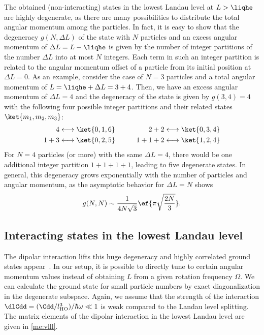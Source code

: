 The obtained (non-interacting) states in the lowest Landau level at $L>\liqhe$ are highly degenerate, as there are many possibilities to distribute the total angular momentum among the particles.
In fact, it is easy to show that the degeneracy $g(N, \Delta L)$ of the state with $N$ particles and an excess angular momentum of $\Delta L=L-\liqhe$ is given by the number
of integer partitions of the number $\Delta L$ into at most $N$ integers.
Each term in such an integer partition is related to the angular momentum offset of a particle from its initial position at $\Delta L = 0$.
As an example, consider the case of $N=3$ particles and a total angular momentum of $L=\liqhe + \Delta L = 3+4$. Then, we have an excess angular momentum of $\Delta L=4$ and the degeneracy of the state is given by $g(3,4)=4$ with the following four possible integer partitions and their related states $\ket{m_1,m_2,m_3}$:
\begin{align}
4 &\longleftrightarrow \ket{0,1,6} &\qquad 2+2 \longleftrightarrow \ket{0,3,4}\\
1+3 &\longleftrightarrow \ket{0,2,5}&\qquad 1+1+2 \longleftrightarrow \ket{1,2,4}
\end{align}
For $N = 4$ particles (or more) with the same $\Delta L=4$, there would be one additional integer partition $1+1+1+1$, leading to five degenerate states.
In general, this degeneracy grows exponentially with the number of particles and angular momentum, as the asymptotic behavior for $\Delta L = N$ shows~\cite{Hardy1918}
\begin{align}
g(N,N) \sim \frac{1}{4N\sqrt{3}} \ef{\pi \sqrt{\frac{2N}{3}}}.
\end{align}


\subsection{Interacting states in the lowest Landau level}
The dipolar interaction lifts this huge degeneracy and highly correlated ground states appear~\cite{Cooper2005,Baranov2005,Osterloh2007,Qiu2011,Grass2011,Zhang2014}. In our setup, it is possible to directly tune to certain angular momentum values instead of obtaining $L$ from a given rotation frequency $\Omega$.
We can calculate the ground state for small particle numbers by exact diagonalization in the degenerate subspace.
Again, we assume that the strength of the interaction $\dlCdd=(\Cdd/l_\text{HO}^3)/\hbar\omega \ll 1$ is weak compared to the Landau level splitting.
The matrix elements of the dipolar interaction in the lowest Landau level are given in \cref{me:vlll}.

